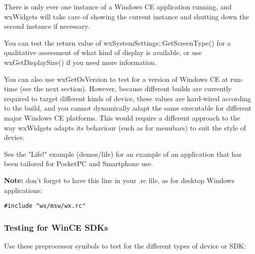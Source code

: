 There is only ever one instance of a Windows CE application running,
and wxWidgets will take care of showing the current instance and
shutting down the second instance if necessary.

You can test the return value of wxSystemSettings::GetScreenType()
for a qualitative assessment of what kind of display is available,
or use wxGetDisplaySize() if you need more information.

You can also use wxGetOsVersion to test for a version of Windows CE at
run-time (see the next section). However, because different builds
are currently required to target different kinds of device, these
values are hard-wired according to the build, and you cannot
dynamically adapt the same executable for different major Windows CE
platforms. This would require a different approach to the way
wxWidgets adapts its behaviour (such as for menubars) to suit the
style of device.

See the "Life!" example (demos/life) for an example of
an application that has been tailored for PocketPC and Smartphone use.

{\bf Note:} don't forget to have this line in your .rc file, as for
desktop Windows applications:

\begin{verbatim}
#include "wx/msw/wx.rc"
\end{verbatim}

\subsubsection{Testing for WinCE SDKs}

Use these preprocessor symbols to test for the different types of device or SDK:

\begin{twocollist}\itemsep=0pt
\end{twocollist}

